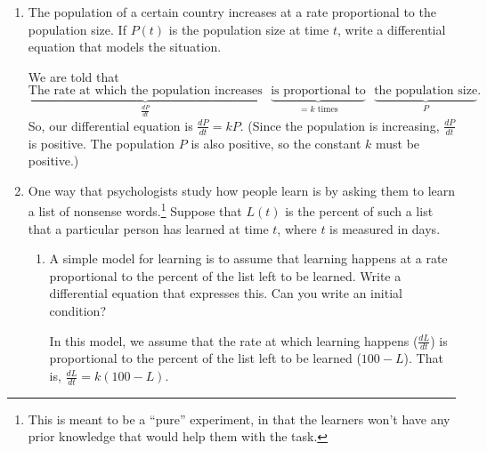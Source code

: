 \documentclass[main]{subfiles}
\begin{document}
\begin{enumerate}[resume]
\item 
  \begin{problem}[\vfill]
    The population of a certain country increases at a rate proportional
    to the population size.  If $P(t)$ is the population size at time $t$,
    write a differential equation that models the situation. 
  \end{problem}

  \begin{solution}
    We are told that
    \[ \underbrace{\text{The rate at which the population
        increases}}_{\frac{dP}{dt}} \text{ } \underbrace{\text{is
        proportional to}}_{= k \text{ times}} \text{ }
    \underbrace{\text{the population size}}_{P}.\] So, our differential
    equation is $\boxed{\frac{dP}{dt} = k P}$.  (Since the population is
    increasing, $\frac{dP}{dt}$ is positive.  The population $P$ is also
    positive, so the constant $k$ must be positive.)
  \end{solution}

\item 
  One way that psychologists study how people learn is by asking them to
  learn a list of nonsense words.\footnote{This is meant to be a ``pure''
    experiment, in that the learners won't have any prior knowledge that
    would help them with the task.}  Suppose that $L(t)$ is the percent of
  such a list that a particular person has learned at time $t$, where $t$
  is measured in days.
  \begin{enumerate}
  \item


    \begin{problem}[\vfill]
      A simple model for learning is to assume that learning happens at a
      rate proportional to the percent of the list left to be learned.
      Write a differential equation that expresses this.  Can you write an
      initial condition?
    \end{problem}

    \begin{solution}
      In this model, we assume that the rate at which learning happens
      ($\frac{dL}{dt}$) is proportional to the percent of the list left to
      be learned ($100 - L$).  That is, $\boxed{\frac{dL}{dt} = k (100 -
        L)}$. 
    \end{solution}


\end{enumerate}
\end{enumerate}
\end{document}
